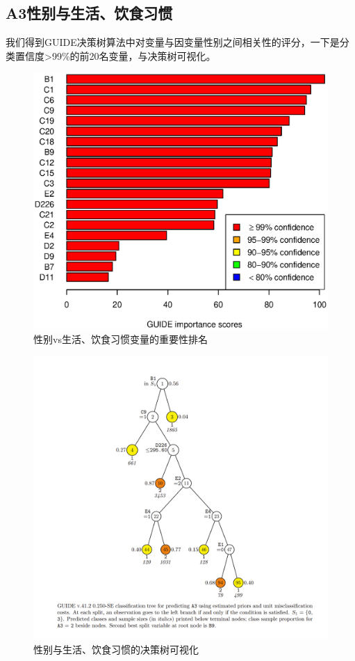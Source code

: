 \documentclass{article}
\begin{document}
\begin{CJK}{UTF8}{gbsn}
\subsection{A3性别与生活、饮食习惯}
我们得到GUIDE决策树算法中对变量与因变量性别之间相关性的评分，一下是分类置信度>99\%的前20名变量，与决策树可视化。
\begin{figure}[htbp]
    \flushleft
    \includegraphics[scale=0.6]{A3_imp.eps}
    \caption{性别vs生活、饮食习惯变量的重要性排名}
    \label{}
\end{figure}
\begin{figure}[htbp]
    \flushleft
    \includegraphics[scale=0.6]{A3_tree.png}
    \caption{性别与生活、饮食习惯的决策树可视化}
    \label{}
\end{figure}


\end{CJK}
\end{document}
